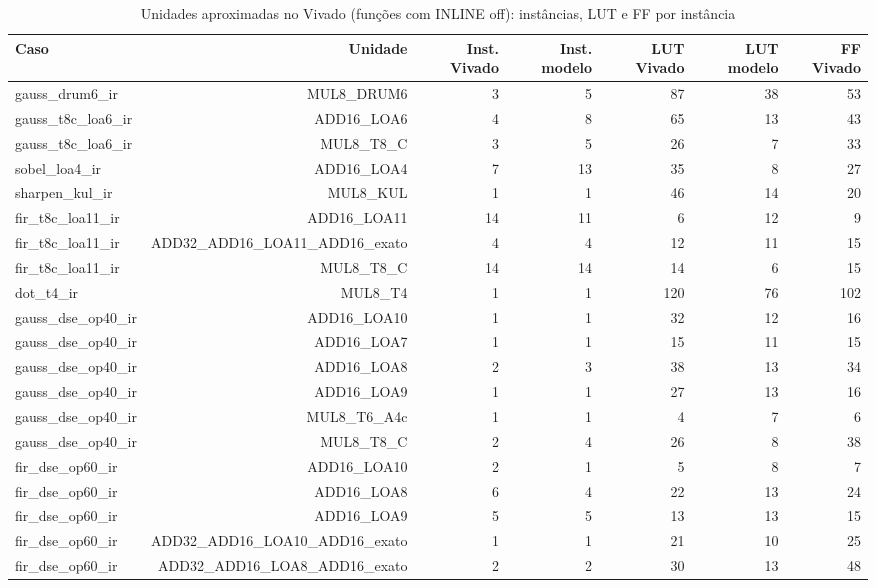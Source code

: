 \begin{table}[htbp]
\centering
\caption{Unidades aproximadas no Vivado (funções com INLINE off): instâncias, LUT e FF por instância}
\begin{tabular}{|l|r|r|r|r|r|r|}
\hline
\rowcolor{tabAzul}\color{white}Caso & \color{white}Unidade & \color{white}Inst. Vivado & \color{white}Inst. modelo & \color{white}LUT Vivado & \color{white}LUT modelo & \color{white}FF Vivado \\
\hline
gauss\_drum6\_ir & MUL8\_DRUM6 & 3 & 5 & 87 & 38 & 53 \\ \hline
gauss\_t8c\_loa6\_ir & ADD16\_LOA6 & 4 & 8 & 65 & 13 & 43 \\ \hline
gauss\_t8c\_loa6\_ir & MUL8\_T8\_C & 3 & 5 & 26 & 7 & 33 \\ \hline
sobel\_loa4\_ir & ADD16\_LOA4 & 7 & 13 & 35 & 8 & 27 \\ \hline
sharpen\_kul\_ir & MUL8\_KUL & 1 & 1 & 46 & 14 & 20 \\ \hline
fir\_t8c\_loa11\_ir & ADD16\_LOA11 & 14 & 11 & 6 & 12 & 9 \\ \hline
fir\_t8c\_loa11\_ir & ADD32\_ADD16\_LOA11\_ADD16\_exato & 4 & 4 & 12 & 11 & 15 \\ \hline
fir\_t8c\_loa11\_ir & MUL8\_T8\_C & 14 & 14 & 14 & 6 & 15 \\ \hline
dot\_t4\_ir & MUL8\_T4 & 1 & 1 & 120 & 76 & 102 \\ \hline
gauss\_dse\_op40\_ir & ADD16\_LOA10 & 1 & 1 & 32 & 12 & 16 \\ \hline
gauss\_dse\_op40\_ir & ADD16\_LOA7 & 1 & 1 & 15 & 11 & 15 \\ \hline
gauss\_dse\_op40\_ir & ADD16\_LOA8 & 2 & 3 & 38 & 13 & 34 \\ \hline
gauss\_dse\_op40\_ir & ADD16\_LOA9 & 1 & 1 & 27 & 13 & 16 \\ \hline
gauss\_dse\_op40\_ir & MUL8\_T6\_A4c & 1 & 1 & 4 & 7 & 6 \\ \hline
gauss\_dse\_op40\_ir & MUL8\_T8\_C & 2 & 4 & 26 & 8 & 38 \\ \hline
fir\_dse\_op60\_ir & ADD16\_LOA10 & 2 & 1 & 5 & 8 & 7 \\ \hline
fir\_dse\_op60\_ir & ADD16\_LOA8 & 6 & 4 & 22 & 13 & 24 \\ \hline
fir\_dse\_op60\_ir & ADD16\_LOA9 & 5 & 5 & 13 & 13 & 15 \\ \hline
fir\_dse\_op60\_ir & ADD32\_ADD16\_LOA10\_ADD16\_exato & 1 & 1 & 21 & 10 & 25 \\ \hline
fir\_dse\_op60\_ir & ADD32\_ADD16\_LOA8\_ADD16\_exato & 2 & 2 & 30 & 13 & 48 \\ \hline

\end{tabular}
\end{table}
